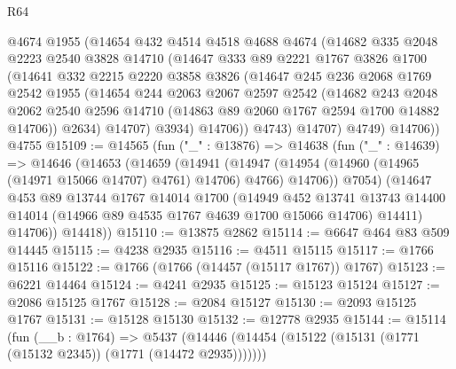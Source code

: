 \begin{lexlean}{R64}
\begin{coremodule}
            @4674
            @1955
            (@14654
              @432
              @4514
              @4518
              @4688
              @4674
              (@14682
                @335
                @2048
                @2223
                @2540
                @3828
                @14710
                (@14647
                  @333
                  @89
                  @2221
                  @1767
                  @3826
                  @1700
                  (@14641
                    @332
                    @2215
                    @2220
                    @3858
                    @3826
                    (@14647
                      @245
                      @236
                      @2068
                      @1769
                      @2542
                      @1955
                      (@14654
                        @244
                        @2063
                        @2067
                        @2597
                        @2542
                        (@14682
                          @243
                          @2048
                          @2062
                          @2540
                          @2596
                          @14710
                          (@14863 @89 @2060 @1767 @2594 @1700 @14882 @14706))
                        @2634)
                      @14707)
                    @3934)
                  @14706))
              @4743)
            @14707)
          @4749)
        @14706))
    @4755
@15109 := @14565
    (fun ("_" : @13876) =>
    @14638
      (fun ("_" : @14639) =>
      @14646
        (@14653
          (@14659
            (@14941
              (@14947 (@14954 (@14960 (@14965 (@14971 @15066 @14707) @4761) @14706) @4766) @14706))
            @7054)
          (@14647
            @453
            @89
            @13744
            @1767
            @14014
            @1700
            (@14949
              @452
              @13741
              @13743
              @14400
              @14014
              (@14966 @89 @4535 @1767 @4639 @1700 @15066 @14706)
              @14411)
            @14706))
        @14418))
@15110 := @13875 @2862
@15114 := @6647 @464 @83 @509 @14445
@15115 := @4238 @2935
@15116 := @4511 @15115
@15117 := @1766 @15116
@15122 := @1766 (@1766 (@14457 (@15117 @1767)) @1767)
@15123 := @6221 @14464
@15124 := @4241 @2935
@15125 := @15123 @15124
@15127 := @2086 @15125 @1767
@15128 := @2084 @15127
@15130 := @2093 @15125 @1767
@15131 := @15128 @15130
@15132 := @12778 @2935
@15144 := @15114
    (fun (__b : @1764) =>
    @5437 (@14446 (@14454 (@15122 (@15131 (@1771 (@15132 @2345)) (@1771 (@14472 @2935)))))))

\end{coremodule}
\end{lexlean}
